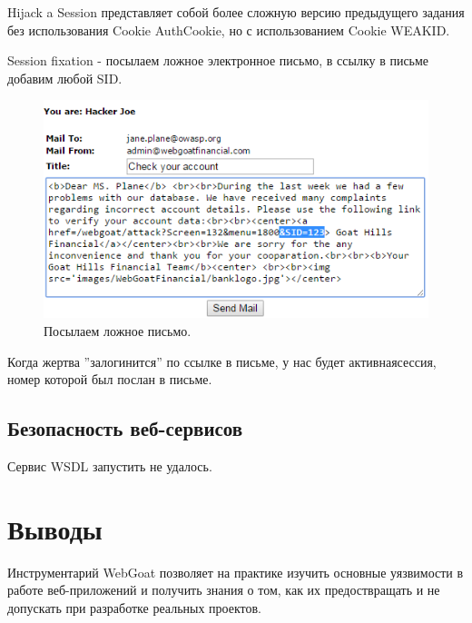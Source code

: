 \documentclass[a4paper, 14pt]{article}				%
\begin{document}
Hijack a Session представляет собой более сложную версию предыдущего задания без использования  Cookie AuthCookie, но с использованием Cookie WEAKID.

Session fixation -  посылаем ложное электронное письмо, в ссылку в письме добавим любой SID.
\begin{figure}[h!]
\centering
\includegraphics[width=\textwidth]{rsrc/9_1}
\caption{Посылаем ложное письмо.}
\end{figure}

Когда жертва ''залогинится'' по ссылке в письме, у нас будет активнаясессия, номер которой был послан в письме.

\subsection{Безопасность веб-сервисов}
Сервис WSDL запустить не удалось.

\section{Выводы}
Инструментарий WebGoat позволяет на практике изучить основные уязвимости в работе веб-приложений и получить знания о том, как их предоствращать и не допускать при разработке реальных проектов.
\end{document}
